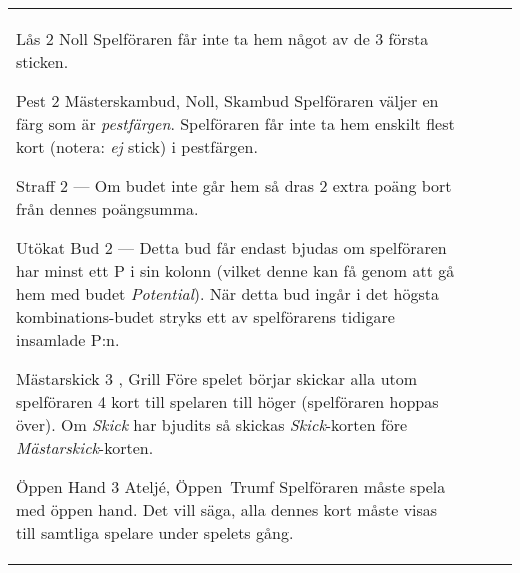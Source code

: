 \begin{table}
\begin{center}
\begin{tabularx}{\textwidth}{
			l
			S[table-number-alignment=center, table-figures-decimal=0]
			p{3cm}
			|X
		}
			\specialBidItem%
			{Lås}
			{2}
			{Noll}
			{%
				Spelföraren får inte ta hem något av de 3 första sticken.
			}

			\specialBidItem%
			{Pest}
			{2}
			{Mästerskambud, Noll, Skambud}
			{%
				Spelföraren väljer en färg som är \emph{pestfärgen}. Spelföraren får inte ta hem enskilt flest kort (notera: \emph{ej} stick) i pestfärgen.
			}

			\specialBidItem%
			{Straff}
			{2}
			{---}
			{%
				Om budet inte går hem så dras 2 extra poäng bort från dennes poängsumma.
			}

			\specialBidItem%
			{Utökat Bud}
			{2}
			{---}
			{%
				Detta bud får endast bjudas om spelföraren har minst ett P i sin kolonn (vilket denne kan få genom att gå hem med budet \emph{Potential}). När detta bud ingår i det högsta kombinations-budet stryks ett av spelförarens tidigare insamlade P:n.
			}

			\specialBidItem%
			{Mästarskick}
			{3}
			{\nonTrump, Grill}
			{%
				Före spelet börjar skickar alla utom spelföraren 4 kort till spelaren till höger (spelföraren hoppas över). Om \emph{Skick} har bjudits så skickas \emph{Skick}-korten före \emph{Mästarskick}-korten.
			}

			\specialBidItem%
			{Öppen Hand}
			{3}
			{Ateljé, Öppen~Trumf}
			{%
				Spelföraren måste spela med öppen hand. Det vill säga, alla dennes kort måste visas till samtliga spelare under spelets gång.
			}
		\end{tabularx}
	\end{center}
\end{table}
